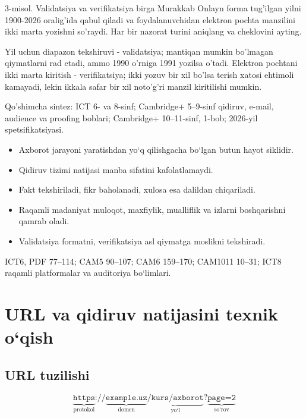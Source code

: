 \documentclass[11pt,a4paper,oneside]{book}
\newcommand{\difficulty}[1]{\hfill\textcolor{Muted}{\scriptsize\sffamily #1}}
\newcommand{\sourcecite}[1]{\begin{sourcebox}\small #1\end{sourcebox}}
\begin{document}
\begin{examplebox}{3-misol. Validatsiya va verifikatsiya birga \difficulty{Murakkab}}
Onlayn forma tug'ilgan yilni 1900-2026 oralig'ida qabul qiladi va foydalanuvchidan elektron pochta manzilini ikki marta yozishni so'raydi. Har bir nazorat turini aniqlang va cheklovini ayting.
\begin{solutionbox}
Yil uchun diapazon tekshiruvi - validatsiya; mantiqan mumkin bo'lmagan qiymatlarni rad etadi, ammo 1990 o'rniga 1991 yozilsa o'tadi. Elektron pochtani ikki marta kiritish - verifikatsiya; ikki yozuv bir xil bo'lsa terish xatosi ehtimoli kamayadi, lekin ikkala safar bir xil noto'g'ri manzil kiritilishi mumkin.
\end{solutionbox}
\end{examplebox}

\sourcecite{Qo'shimcha sintez: ICT 6- va 8-sinf; Cambridge+ 5--9-sinf qidiruv, e-mail, audience va proofing boblari; Cambridge+ 10--11-sinf, 1-bob; 2026-yil spetsifikatsiyasi.}

\begin{recapbox}
\begin{itemize}
\item Axborot jarayoni yaratishdan yo‘q qilishgacha bo‘lgan butun hayot siklidir.
\item Qidiruv tizimi natijasi manba sifatini kafolatlamaydi.
\item Fakt tekshiriladi, fikr baholanadi, xulosa esa dalildan chiqariladi.
\item Raqamli madaniyat muloqot, maxfiylik, mualliflik va izlarni boshqarishni qamrab oladi.
\item Validatsiya formatni, verifikatsiya asl qiymatga moslikni tekshiradi.
\end{itemize}
\end{recapbox}
\sourcecite{ICT6, PDF 77--114; CAM5 90--107; CAM6 159--170; CAM1011 10--31; ICT8 raqamli platformalar va auditoriya bo‘limlari.}
\section{URL va qidiruv natijasini texnik o‘qish}
\subsection{URL tuzilishi}

\[
\underbrace{\texttt{https}}_{\text{protokol}}
\texttt{://}
\underbrace{\texttt{example.uz}}_{\text{domen}}
\underbrace{\texttt{/kurs/axborot}}_{\text{yo‘l}}
\texttt{?}
\underbrace{\texttt{page=2}}_{\text{so‘rov}}
\]
\end{document}
